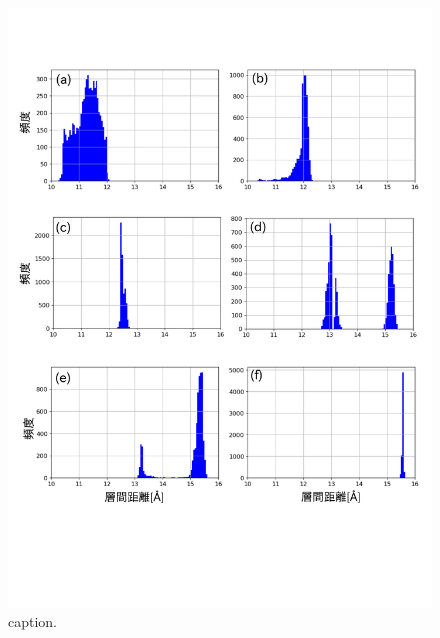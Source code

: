 \begin{figure}[h]
	\begin{center}
	\includegraphics[width=1.0\linewidth]{Figs/fig5.pdf} 
	\end{center}
	\caption{
		caption.
	} 
	\label{fig:fig5}
\end{figure}
